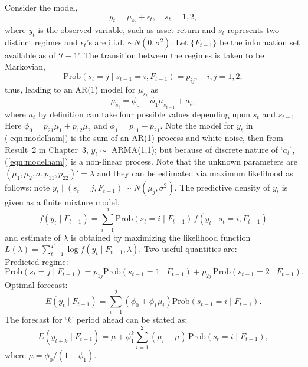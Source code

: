 Consider the model,
	\begin{equation}\label{eqn:modelham}
	y_t = \mu_{s_t} + \epsilon_t, \quad s_t= 1, 2,
	\end{equation} 
where $y_t$ is the observed variable, such as asset return and $s_t$ represents two distinct regimes and $\epsilon_t$'s are i.i.d. $\sim N(0,\sigma^2)$. Let $\{ F_{t-1} \}$ be the information set available as of `$t-1$'. The transition between the regimes is taken to be Markovian,
	\begin{equation}\label{eqn:markprob}
	\text{Prob}(s_t= j \;|\; s_{t-1}= i, F_{t-1}) = p_{ij}, \quad i,j= 1, 2;
	\end{equation}
thus, leading to an AR(1) model for $\mu_{s_t}$ as
	\begin{equation}\label{eqn:must}
	\mu_{s_t} = \phi_0 + \phi_1 \mu_{s_{t-1}} + a_t,
	\end{equation}
where $a_t$ by definition can take four possible values depending upon $s_t$ and $s_{t-1}$. Here $\phi_0= p_{21} \mu_1 + p_{12} \mu_2$ and $\phi_1= p_{11} - p_{21}$. Note the model for $y_t$ in (\ref{eqn:modelham}) is the sum of an AR(1) process and white noise, then from Result~2 in Chapter~3, $y_t \sim$ ARMA(1,1); but because of discrete nature of `$a_t$', (\ref{eqn:modelham}) is a non-linear process. Note that the unknown parameters are $(\mu_1, \mu_2, \sigma,p_{11}, p_{22})'= \lambda$ and they can be estimated via maximum likelihood as follows: note $y_t \;|\; (s_t= j, F_{t-1}) \sim N(\mu_j,\sigma^2)$. The predictive density of $y_t$ is given as a finite mixture model,
	\begin{equation}\label{eqn:predden}
	f(y_t \;|\; F_{t-1})= \sum_{i=1}^2 \text{Prob}(s_t= i \;|\; F_{t-1}) \, f(y_t \;|\; s_t= i, F_{t-1})
	\end{equation}
and estimate of $\lambda$ is obtained by maximizing the likelihood function $L(\lambda)= \sum_{t=1}^T \log f(y_t \;|\; F_{t-1}, \lambda)$. Two useful quantities are: \\


\noindent Predicted regime: 
	\begin{equation} \label{eqn:predreg}
	\text{Prob}(s_t= j \;|\; F_{t-1})= p_{1j} \text{Prob}(s_{t-1}=1 \;|\; F_{t-1}) + p_{2j} \,\text{Prob}(s_{t-1}=2 \;|\; F_{t-1}).
	\end{equation}
\noindent Optimal forecast:
	\begin{equation} \label{eqn:optfore}
	E(y_t \;|\; F_{t-1})= \sum_{i=1}^2 (\phi_0+\phi_1 \mu_i) \text{Prob}(s_{t-1}=i \;|\; F_{t-1}).
	\end{equation}
The forecast for `$k$' period ahead can be stated as:
	\begin{equation} \label{eqn:period}
	E(y_{t+k} \;|\; F_{t-1}) = \mu+\phi_1^k \sum_{i=1}^2 (\mu_i-\mu)\, \text{Prob}(s_t=i \;|\; F_{t-1}),
	\end{equation}
where $\mu=\phi_0/(1-\phi_1)$.


